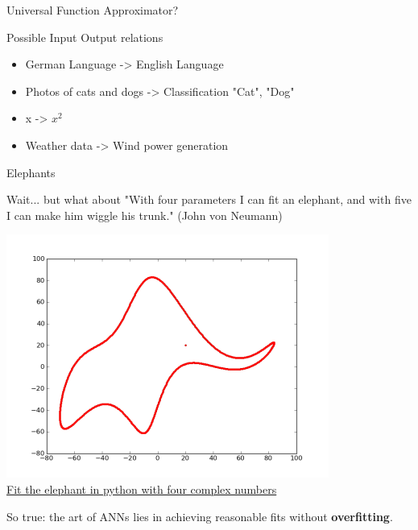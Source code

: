\documentclass[color=usenames,dvipsnames]{beamer}
\begin{document}
\begin{frame}{Universal Function Approximator?} 


\vspace{1cm}

Possible Input Output relations
\begin{itemize}
\item German Language -> English Language
\item Photos of cats and dogs -> Classification "Cat", "Dog"
\item x -> $x^2$
\item Weather data -> Wind power generation	
\end{itemize}

\end{frame}

\begin{frame}{Elephants} 

Wait... but what about "With four parameters I can fit an elephant, and with five I can make him wiggle his trunk." (John von Neumann)\\


\begin{center}
\includegraphics[width=0.5\linewidth]{../figures/elephant.png}\\

\href{https://www.johndcook.com/blog/2011/06/21/how-to-fit-an-elephant/}{{Fit the elephant in python with four complex numbers}}

\end{center}

So true: the art of ANNs lies in achieving reasonable fits without \textbf{overfitting}.\\ 

\end{frame}
\end{document}
